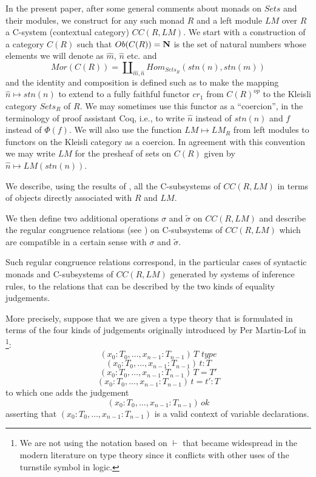 \documentclass[11pt]{article}
\newcommand{\nn}{{\bf N\rm}}
\newcommand{\wt}{\widetilde}
\newcommand{\wh}{\widehat}
\begin{document}
In the present paper, after some general comments about monads on $Sets$ and their modules, we construct for any such monad $R$ and a left module $LM$ over $R$ a C-system (contextual category) $CC(R,LM)$.  We start with a construction of a category ${C(R)}$ such that $Ob({C(R)})=\nn$ is the set of natural numbers whose elements we will denote as $\wh{m}$, $\wh{n}$ etc. and
%
$$Mor({C(R)})=\amalg_{\wh{m},\wh{n}}Hom_{Sets_R}(stn(n),stn(m))$$
%
and the identity and composition is defined such as to make the mapping $\wh{n}\mapsto stn(n)$ to extend to a fully faithful functor $cr_1$ from ${C(R)}^{op}$ to the Kleisli category $Sets_R$ of $R$.  We may sometimes  use this functor as a ``coercion'', in the terminology of proof assistant Coq, i.e., to write $\wh{n}$ instead of $stn(n)$ and $f$ instead of $\Phi(f)$. We will also use the function $LM\mapsto LM_R$ from left modules to functors on the Kleisli category as a coercion. In agreement with this convention we may write $LM$ for the presheaf of sets on ${C(R)}$ given by $\wh{n}\mapsto LM(stn(n))$.  

We describe, using the results of \cite{Csubsystems}, all the C-subsystems of $CC(R,LM)$ in terms of objects directly associated with $R$ and $LM$. 

We then define two additional operations $\sigma$ and $\wt{\sigma}$ on $CC(R,LM)$ and describe the regular congruence relations (see \cite{Csubsystems}) on C-subsystems of $CC(R,LM)$ which are compatible in a certain sense with $\sigma$ and $\wt{\sigma}$.

Such regular congruence relations correspond, in the particular cases of syntactic monads and C-subsystems of $CC(R,LM)$ generated by systems of inference rules, to the relations that can be described by the two kinds of equality judgements. 

More precisely, suppose that we are given a type theory that is formulated in terms of the four kinds of judgements originally introduced by Per Martin-Lof in \cite[p.161]{MLTT79}\footnote{We are not using the notation based on $\vdash$ that became widespread in the modern literature on type theory since it conflicts with other uses of the turnstile symbol in logic.}:
%
$$(x_0:T_0,\dots,x_{n-1}:T_{n-1})\,T\,\,type$$
$$(x_0:T_0,\dots,x_{n-1}:T_{n-1})\,t:T$$
$$(x_0:T_0,\dots,x_{n-1}:T_{n-1})\,T=T'$$
$$(x_0:T_0,\dots,x_{n-1}:T_{n-1})\,t=t':T$$
%
to which one adds the judgement
%
$$(x_0:T_0,\dots,x_{n-1}:T_{n-1})\,ok$$
%
asserting that $(x_0:T_0,\dots,x_{n-1}:T_{n-1})$ is a valid context of variable declarations.
\end{document}
